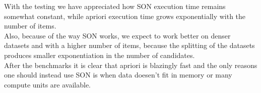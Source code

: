 \documentclass[a4paper]{article}
\begin{document}
	With the testing we have appreciated how SON execution time remains somewhat constant, while apriori execution time grows exponentially with the number of items.\\
	Also, because of the way SON works, we expect to work better on denser datasets and with a higher number of items, because the splitting of the datasets produces
	smaller exponentiation in the number of candidates.\\
	
	After the benchmarks it is clear that apriori is blazingly fast and the only reasons one should instead use SON is when data doesen't fit in memory or many compute units are available.
	
\end{document}

